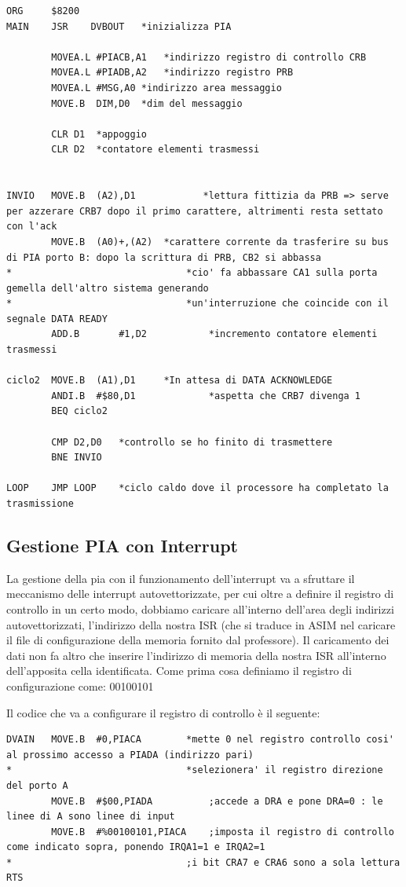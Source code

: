 \begin{lstlisting}
ORG     $8200
MAIN    JSR    DVBOUT	*inizializza PIA 

        MOVEA.L	#PIACB,A1	*indirizzo registro di controllo CRB
        MOVEA.L	#PIADB,A2	*indirizzo registro PRB
        MOVEA.L	#MSG,A0	*indirizzo area messaggio
        MOVE.B	DIM,D0	*dim del messaggio

        CLR	D1	*appoggio
        CLR	D2	*contatore elementi trasmessi


INVIO	MOVE.B	(A2),D1            *lettura fittizia da PRB => serve per azzerare CRB7 dopo il primo carattere, altrimenti resta settato con l'ack
        MOVE.B	(A0)+,(A2)	*carattere corrente da trasferire su bus di PIA porto B: dopo la scrittura di PRB, CB2 si abbassa
*								*cio' fa abbassare CA1 sulla porta gemella dell'altro sistema generando 
*								*un'interruzione che coincide con il segnale DATA READY
        ADD.B		#1,D2		    *incremento contatore elementi trasmessi

ciclo2	MOVE.B	(A1),D1		*In attesa di DATA ACKNOWLEDGE
        ANDI.B	#$80,D1				*aspetta che CRB7 divenga 1
        BEQ	ciclo2

        CMP	D2,D0	*controllo se ho finito di trasmettere
        BNE	INVIO

LOOP  	JMP LOOP	*ciclo caldo dove il processore ha completato la trasmissione	
\end{lstlisting}

\newpage

\subsection{Gestione PIA con Interrupt}\label{par:PIA-POL}
La gestione della pia con il funzionamento dell'interrupt va a sfruttare il meccanismo delle interrupt autovettorizzate, per cui oltre a definire il registro di controllo in un certo modo, dobbiamo caricare all'interno dell'area degli indirizzi autovettorizzati, l'indirizzo della nostra ISR (che si traduce in ASIM nel caricare il file di configurazione della memoria fornito dal professore). Il caricamento dei dati non fa altro che inserire l'indirizzo di memoria della nostra ISR all'interno dell'apposita cella identificata.
Come prima cosa definiamo il registro di configurazione come: 00100101

Il codice che va a configurare il registro di controllo è il seguente:
\begin{lstlisting}
DVAIN	MOVE.B	#0,PIACA		*mette 0 nel registro controllo cosi' al prossimo accesso a PIADA (indirizzo pari)
*								*selezionera' il registro direzione del porto A
        MOVE.B	#$00,PIADA		    ;accede a DRA e pone DRA=0 : le linee di A sono linee di input	
        MOVE.B	#%00100101,PIACA  	;imposta il registro di controllo come indicato sopra, ponendo IRQA1=1 e IRQA2=1
*								;i bit CRA7 e CRA6 sono a sola lettura	
RTS
\end{lstlisting}

